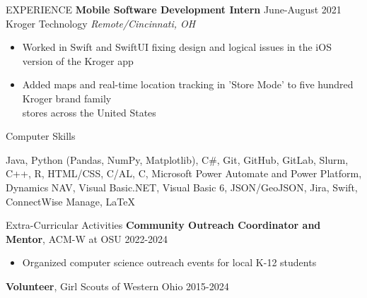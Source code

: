 \documentclass{resume} %
\begin{document}
\begin{rSection}{EXPERIENCE}
  \textbf{Mobile Software Development Intern} \hfill June-August 2021\\
Kroger Technology \hfill \textit{Remote/Cincinnati, OH}
 \begin{itemize}
    \itemsep -2pt {} 
    \item Worked in Swift and SwiftUI fixing design and logical  issues in the iOS version of the Kroger app
    \item Added maps and real-time location tracking in 'Store Mode' to five hundred Kroger brand family \\stores across the United States
 \end{itemize}

\end{rSection} 

\begin{rSection}{Computer Skills}

Java, Python (Pandas, NumPy, Matplotlib), C\#, Git, GitHub, GitLab, Slurm, C++, R, HTML/CSS, C/AL, C, Microsoft Power Automate and Power Platform, Dynamics NAV, Visual Basic.NET, Visual Basic 6, JSON/GeoJSON, Jira, Swift, ConnectWise Manage, \LaTeX
\end{rSection}

\begin{rSection}{Extra-Curricular Activities} 
\textbf{Community Outreach Coordinator and Mentor}, ACM-W at OSU \hfill 2022-2024
     \begin{itemize}
        \item Organized computer science outreach events for local K-12 students
    \end{itemize}
    \textbf{Volunteer}, Girl Scouts of Western Ohio \hfill 2015-2024
    \\



\end{rSection}
\end{document}

